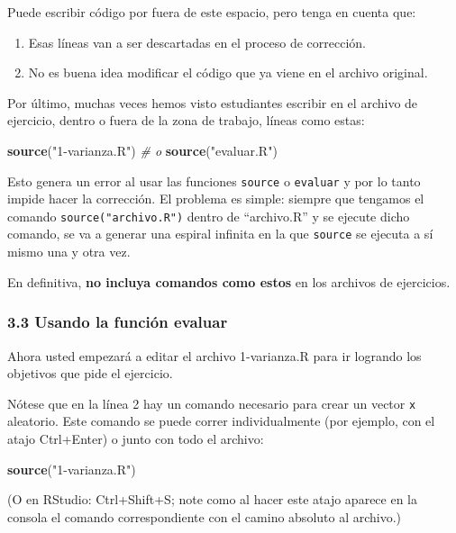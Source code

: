 \documentclass[]{article}
\newenvironment{Shaded}{}{}
\newcommand{\KeywordTok}[1]{\textcolor[rgb]{0.00,0.44,0.13}{\textbf{{#1}}}}
\newcommand{\StringTok}[1]{\textcolor[rgb]{0.25,0.44,0.63}{{#1}}}
\newcommand{\CommentTok}[1]{\textcolor[rgb]{0.38,0.63,0.69}{\textit{{#1}}}}
\newcommand{\NormalTok}[1]{{#1}}
\begin{document}
Puede escribir código por fuera de este espacio, pero tenga en cuenta
que:

\begin{enumerate}[1.]
\item
  Esas líneas van a ser descartadas en el proceso de corrección.
\item
  No es buena idea modificar el código que ya viene en el archivo
  original.
\end{enumerate}
Por último, muchas veces hemos visto estudiantes escribir en el archivo
de ejercicio, dentro o fuera de la zona de trabajo, líneas como estas:

\begin{Shaded}
\begin{Highlighting}[]
\KeywordTok{source}\NormalTok{(}\StringTok{"1-varianza.R"}\NormalTok{)}
\CommentTok{# o}
\KeywordTok{source}\NormalTok{(}\StringTok{"evaluar.R"}\NormalTok{)}
\end{Highlighting}
\end{Shaded}
Esto genera un error al usar las funciones \texttt{source} o
\texttt{evaluar} y por lo tanto impide hacer la corrección. El problema
es simple: siempre que tengamos el comando \texttt{source("archivo.R")}
dentro de ``archivo.R'' y se ejecute dicho comando, se va a generar una
espiral infinita en la que \texttt{source} se ejecuta a sí mismo una y
otra vez.

En definitiva, \textbf{no incluya comandos como estos} en los archivos
de ejercicios.

\subsubsection{3.3 Usando la función evaluar}

Ahora usted empezará a editar el archivo 1-varianza.R para ir logrando
los objetivos que pide el ejercicio.

Nótese que en la línea 2 hay un comando necesario para crear un vector
\texttt{x} aleatorio. Este comando se puede correr individualmente (por
ejemplo, con el atajo Ctrl+Enter) o junto con todo el archivo:

\begin{Shaded}
\begin{Highlighting}[]
\KeywordTok{source}\NormalTok{(}\StringTok{"1-varianza.R"}\NormalTok{)}
\end{Highlighting}
\end{Shaded}
(O en RStudio: Ctrl+Shift+S; note como al hacer este atajo aparece en la
consola el comando correspondiente con el camino absoluto al archivo.)
\end{document}
